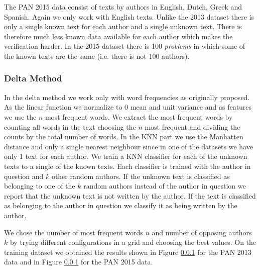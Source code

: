 The PAN 2015 data consist of texts by authors in English, Dutch, Greek and
Spanish. Again we only work with English texts. Unlike the 2013 dataset there is
only a single known text for each author and a single unknown text. There is
therefore much less known data available for each author which makes the
verification harder. In the 2015 dataset there is 100 \textit{problems} in which
some of the known texts are the same (i.e. there is not 100 authors).

\subsubsection{Delta Method}
In the delta method we work only with word frequencies as originally proposed.
As the linear function we normalize to 0 mean and unit variance and as features
we use the $n$ most frequent words. We extract the most frequent words by
counting all words in the text choosing the $n$ most frequent and dividing the
counts by the total number of words. In the \gls{KNN} part we use the Manhatten
distance and only a single nearest neighbour since in one of the datasets we
have only 1 text for each author. We train a \gls{KNN} classifier for each of
the unknown texts to a single of the known texts. Each classifier is trained
with the author in question and $k$ other random authors. If the unknown text is
classified as belonging to one of the $k$ random authors instead of the author
in question we report that the unknown text is not written by the author. If the
text is classified as belonging to the author in question we classify it as
being written by the author.

We chose the number of most frequent words $n$ and number of opposing authors
$k$ by trying different configurations in a grid and choosing the best values.
On the training dataset we obtained the results shown in Figure \ref{} for the
PAN 2013 data and in Figure \ref{} for the PAN 2015 data.

